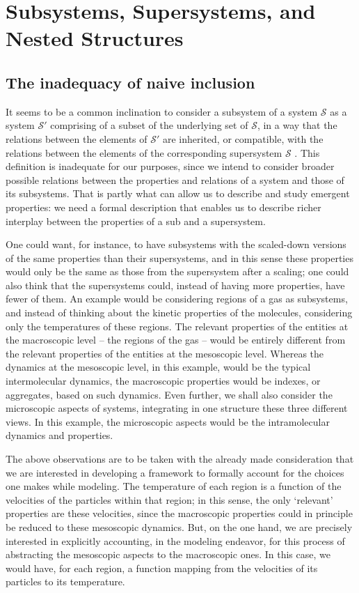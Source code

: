 \section{Subsystems, Supersystems, and Nested Structures}

\subsection{The inadequacy of naive inclusion}

It seems to be a common inclination to consider a subsystem of a system $\mathcal{S}$ as a system $\mathcal{S}'$ comprising of a subset of the underlying set of $\mathcal{S}$, in a way that the relations between the elements of $\mathcal{S}'$ are inherited, or compatible, with the relations between the elements of the corresponding supersystem $\mathcal{S}$ \cite{Mesarovic1976}. This definition is inadequate for our purposes, since we intend to consider broader possible relations between the properties and relations of a system and those of its subsystems. That is partly what can allow us to describe and study emergent properties: we need a formal description that enables us to describe richer interplay between the properties of a sub and a supersystem. 

One could want, for instance, to have subsystems with the scaled-down versions of the same properties than their supersystems, and in this sense these properties would only be the same as those from the supersystem after a scaling; one could also think that the supersystems could, instead of having more properties, have fewer of them. An example would be considering regions of a gas as subsystems, and instead of thinking about the kinetic properties of the molecules, considering only the temperatures of these regions. The relevant properties of the entities at the macroscopic level -- the regions of the gas -- would be entirely different from the relevant properties of the entities at the mesoscopic level. Whereas the dynamics at the mesoscopic level, in this example, would be the typical intermolecular dynamics, the macroscopic properties would be indexes, or aggregates, based on such dynamics. Even further, we shall also consider the microscopic aspects of systems, integrating in one structure these three different views. In this example, the microscopic aspects would be the intramolecular dynamics and properties.

The above observations are to be taken with the already made consideration that we are interested in developing a framework to formally account for the choices one makes while modeling. The temperature of each region is a function of the velocities of the particles within that region; in this sense, the only `relevant' properties are these velocities, since the macroscopic properties could in principle be reduced to these mesoscopic dynamics. But, on the one hand, we are precisely interested in explicitly accounting, in the modeling endeavor, for this process of abstracting the mesoscopic aspects to the macroscopic ones. In this case, we would have, for each region, a function mapping from the velocities of its particles to its temperature. 

